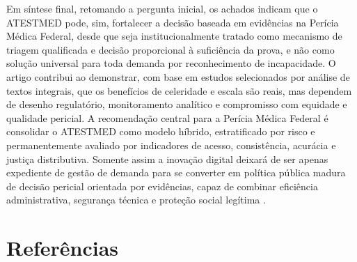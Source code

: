 \documentclass[12pt,a4paper]{article}
\begin{document}
Em síntese final, retomando a pergunta inicial, os achados indicam que o ATESTMED pode, sim, fortalecer a decisão baseada em evidências na Perícia Médica Federal, desde que seja institucionalmente tratado como mecanismo de triagem qualificada e decisão proporcional à suficiência da prova, e não como solução universal para toda demanda por reconhecimento de incapacidade. O artigo contribui ao demonstrar, com base em estudos selecionados por análise de textos integrais, que os benefícios de celeridade e escala são reais, mas dependem de desenho regulatório, monitoramento analítico e compromisso com equidade e qualidade pericial. A recomendação central para a Perícia Médica Federal é consolidar o ATESTMED como modelo híbrido, estratificado por risco e permanentemente avaliado por indicadores de acesso, consistência, acurácia e justiça distributiva. Somente assim a inovação digital deixará de ser apenas expediente de gestão de demanda para se converter em política pública madura de decisão pericial orientada por evidências, capaz de combinar eficiência administrativa, segurança técnica e proteção social legítima \parencite{soares20241031t0000000000asistematicadoatestmednaconcessa, ftouni2022challengesoftelemedicineduringthecovid19pandemica, gabbay2011niceguidanceonlongtermsicknessandincapacity}.

\section{Referências}
\label{sec:orgee07018}
\printbibliography[heading=none]
\end{document}

